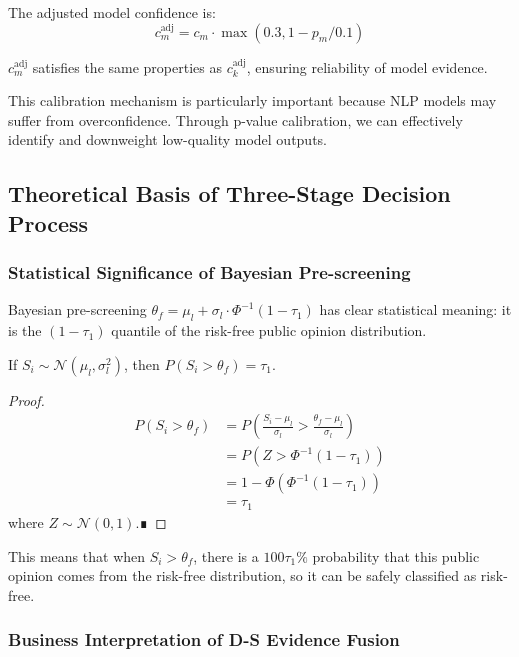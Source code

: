 \documentclass[11pt,a4paper]{report}
\newcommand{\Phi}{\varPhi}
\begin{document}
The adjusted model confidence is:
\[
c_m^{\text{adj}} = c_m \cdot \max(0.3, 1 - p_m/0.1)
\]

\begin{theorem}
$c_m^{\text{adj}}$ satisfies the same properties as $c_k^{\text{adj}}$, ensuring reliability of model evidence.
\end{theorem}

This calibration mechanism is particularly important because NLP models may suffer from overconfidence. Through p-value calibration, we can effectively identify and downweight low-quality model outputs.

\subsection{Theoretical Basis of Three-Stage Decision Process}

\subsubsection{Statistical Significance of Bayesian Pre-screening}

Bayesian pre-screening $\theta_f = \mu_l + \sigma_l \cdot \Phi^{-1}(1 - \tau_1)$ has clear statistical meaning: it is the $(1-\tau_1)$ quantile of the risk-free public opinion distribution.

\begin{theorem}
If $S_i \sim \mathcal{N}(\mu_l, \sigma_l^2)$, then $P(S_i > \theta_f) = \tau_1$.
\end{theorem}

\begin{proof}
\[
\begin{aligned}
P(S_i > \theta_f) &= P\left(\frac{S_i - \mu_l}{\sigma_l} > \frac{\theta_f - \mu_l}{\sigma_l}\right) \\
&= P\left(Z > \Phi^{-1}(1 - \tau_1)\right) \\
&= 1 - \Phi(\Phi^{-1}(1 - \tau_1)) \\
&= \tau_1
\end{aligned}
\]
where $Z \sim \mathcal{N}(0,1)$.∎
\end{proof}

This means that when $S_i > \theta_f$, there is a $100\tau_1\%$ probability that this public opinion comes from the risk-free distribution, so it can be safely classified as risk-free.

\subsubsection{Business Interpretation of D-S Evidence Fusion}
\end{document}
